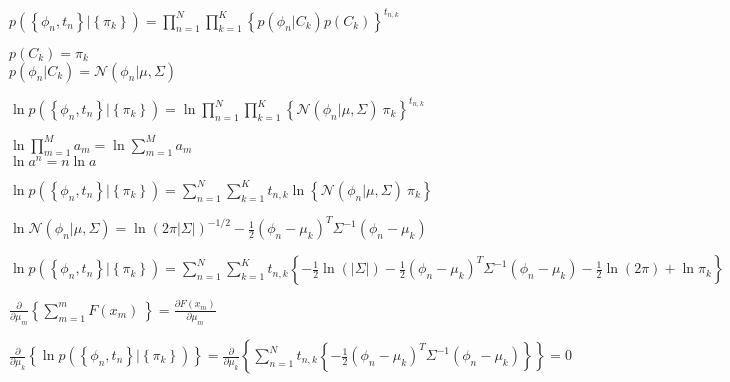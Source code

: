 \documentclass{article}
\begin{document}
$ \displaystyle
   p\left(\left\{\phi_n ,t_n\right\}|\left\{\pi_k\right\}\right)=
   \prod_{n=1}^{N}{
        \prod_{k=1}^{K}{
            \left\{p\left(\phi_n|C_k\right) p\left(C_k\right)\right\}^{t_{n,k}} 
        }
    }
$
\begin{center}
    $ \displaystyle p\left(C_k\right)=\pi_k $ \\
    $ \displaystyle p\left(\phi_n|C_k\right)=\mathcal{N}\left(\phi_n|\mu,\Sigma\right) $
\end{center}

$ \displaystyle
    \ln{p\left(\left\{\phi_n,t_n\right\}|\left\{\pi_k\right\}\right)}=\ln{
        \prod_{n=1}^{N}{
            \prod_{k=1}^{K}{
                \left\{\mathcal{N}\left(\phi_n|\mu,\Sigma\right)\ \pi_k\right\}^{t_{n,k}}
                }\
            }
        }
$
\begin{center}
    $ \displaystyle \ln{\prod_{m=1}^{M}a_m}=\ln{\sum_{m=1}^{M}a_m} $ \\
    $ \displaystyle \ln{a^n}=n\ln{a} $
\end{center}

$ \displaystyle
    \ln{
        p\left(\left\{\phi_n,t_n\right\}|\left\{\pi_k\right\}\right)
    }=
    \sum_{n=1}^{N}{
        \sum_{k=1}^{K}{t_{n,k}{
            \ln{
                \left\{\mathcal{N}\left(\phi_n|\mu,\Sigma\right)\ \pi_k\right\}}
            }
        }
    }
$
\begin{center}
    $\displaystyle \ln{\mathcal{N}\left(\phi_n|\mu,\Sigma\right)}=\ln{\left(2\pi\left|\Sigma\right|\right)^{-1/2}}-\frac{1}{2}\left(\phi_n-\mu_k\right)^T\Sigma^{-1}\left(\phi_n-\mu_k\right) $
\end{center}

$\displaystyle
    \ln{
        p\left(\left\{\phi_n,t_n\right\}|\left\{\pi_k\right\}\right)
    }=\sum_{n=1}^{N}{
        \sum_{k=1}^{K}{t_{n,k}{
            \left\{-\frac{1}{2}\ln{\left(\left|\Sigma\right|\right)}-\frac{1}{2}\left(\phi_n-\mu_k\right)^T\Sigma^{-1}\left(\phi_n-\mu_k\right)-\frac{1}{2}\ln{\left(2\pi\right)}+\ln{\pi_k}\right\}}
        }
    }
$
\begin{center}
    $\displaystyle \frac{\partial}{\partial\mu_m}\left\{\sum_{m=1}^{m}{F\left(x_m\right)\ }\right\}=\frac{\partial F\left(x_m\right)}{\partial\mu_m}$
\end{center}

$ \displaystyle
    \frac{\partial}{\partial\mu_k}\left\{\ln{p\left(\left\{\phi_n,t_n\right\}|\left\{\pi_k\right\}\right)}\right\}=\frac{\partial}{\partial\mu_k}\left\{\sum_{n=1}^{N}{t_{n,k}\left\{-\frac{1}{2}\left(\phi_n-\mu_k\right)^T\Sigma^{-1}\left(\phi_n-\mu_k\right)\right\}}\right\}=0
$
\end{document}
